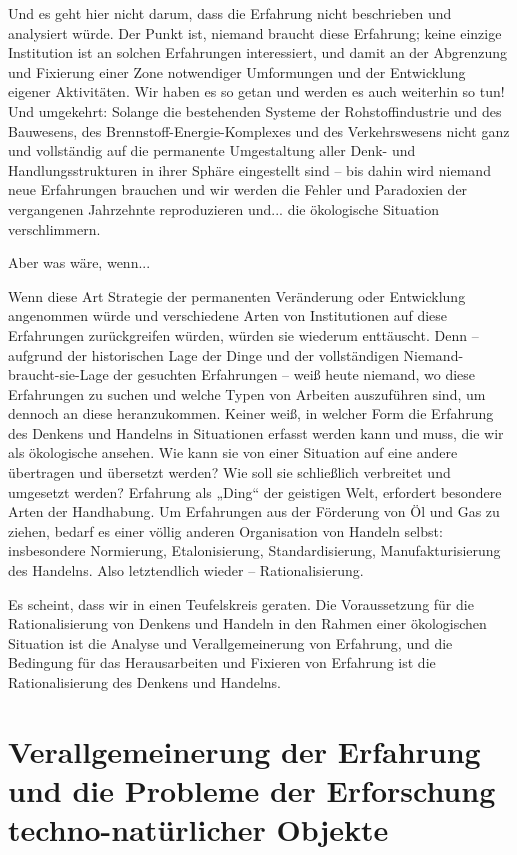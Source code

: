 \documentclass[11pt,a4paper]{article}
\begin{document}
Und es geht hier nicht darum, dass die Erfahrung nicht beschrieben und
analysiert würde. Der Punkt ist, niemand braucht diese Erfahrung; keine
einzige Institution ist an solchen Erfahrungen interessiert, und damit an der
Abgrenzung und Fixierung einer Zone notwendiger Umformungen und der
Entwicklung eigener Aktivitäten. Wir haben es so getan und werden es auch
weiterhin so tun! Und umgekehrt: Solange die bestehenden Systeme der
Rohstoff\-industrie und des Bauwesens, des Brennstoff-Energie-Komplexes und
des Verkehrswesens nicht ganz und vollständig auf die permanente Umgestaltung
aller Denk- und Handlungsstrukturen in ihrer Sphäre eingestellt sind -- bis
dahin wird niemand neue Erfahrungen brauchen und wir werden die Fehler und
Paradoxien der vergangenen Jahrzehnte reproduzieren und... die ökologische
Situation verschlimmern.

Aber was wäre, wenn...

Wenn diese Art Strategie der permanenten Veränderung oder Entwicklung
angenommen würde und verschiedene Arten von Institutionen auf diese
Erfahrungen zurückgreifen würden, würden sie wiederum enttäuscht. Denn --
aufgrund der historischen Lage der Dinge und der vollständigen
Niemand-braucht-sie-Lage der gesuchten Erfahrungen -- weiß heute niemand, wo
diese Erfahrungen zu suchen und welche Typen von Arbeiten auszuführen sind, um
dennoch an diese heranzukommen. Keiner weiß, in welcher Form die Erfahrung des
Denkens und Handelns in Situationen erfasst werden kann und muss, die wir als
ökologische ansehen.  Wie kann sie von einer Situation auf eine andere
übertragen und übersetzt werden? Wie soll sie schließlich verbreitet und
umgesetzt werden?  Erfahrung als „Ding“ der geistigen Welt, erfordert
besondere Arten der Handhabung. Um Erfahrungen aus der Förderung von Öl und
Gas zu ziehen, bedarf es einer völlig anderen Organisation von Handeln selbst:
insbesondere Normierung, Etalonisierung, Standardisierung, Manufakturisierung
des Handelns. Also letztendlich wieder -- Rationalisierung.

Es scheint, dass wir in einen Teufelskreis geraten. Die Voraussetzung für die
Rationalisierung von Denkens und Handeln in den Rahmen einer ökologischen
Situation ist die Analyse und Verallgemeinerung von Erfahrung, und die
Bedingung für das Herausarbeiten und Fixieren von Erfahrung ist die
Rationalisierung des Denkens und Handelns.

\section{Verallgemeinerung der Erfahrung und die Probleme der Erforschung
  techno-natürlicher Objekte} 
\end{document}
